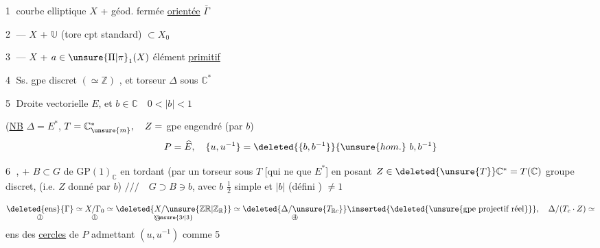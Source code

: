 \textcircled{1} courbe elliptique $X$ + géod. fermée \uline{orientée} $\bar\Gamma$ 

\textcircled{2} --- $X$ +    $\mathbb U$ (tore cpt standard) $\subset X_0$

\textcircled{3} --- $X$ + $a\in\unsure{\Pi|\pi}_1(X)$ élément \uline{primitif}

\textcircled{4} Ss. gpe discret $(\simeq\mathbb Z)$ , et torseur $\Delta$ sous $\mathbb C^*$ 

\textcircled{5} Droite vectorielle  $E$,   et $b\in\mathbb C\quad 0<|b|<1$

(\uline{NB} $\Delta=E^*$,  $T=\mathbb C^*_{\unsure{m}},\quad Z=$ gpe engendré (par $b$)
\[
P=\widehat E,\quad \{u,u^{-1}\}=\deleted{\{b,b^{-1}\}}\{\unsure{hom.}\ b,b^{-1}\}
\]

\textcircled{6} , +   $B\subset G$  
de $\mathrm{GP}(1)_{\mathbb C}$ en tordant (par un torseur sous $T$
[qui ne  que $E^*$] en posant $Z\in\deleted{\unsure{T}}\mathbb C^*=T(\mathbb C)$ groupe discret,
(i.e. $Z$ donné par $b$) $///\quad G\supset B\ni b$, avec $b$ $\frac12$ simple
et $|b|$ (défini ) $\ne1$

\[
\underset{\text{\textcircled{1}}}{\deleted{\mathrm{ens}}\{\Gamma\}}
\simeq\underset{\text{\textcircled{1}}}{X/\Gamma_0}
\simeq\underset{\text{\textcircled{$\unsure{3\prime|3}$}}}{\deleted{X/\unsure{\mathbb Z\mathbb R|\mathbb Z_{\mathbb R}}}}
\simeq\underset{\text{\textcircled{4}}}{\deleted{\Delta/\unsure{T_{\mathbb R c}}}}
\inserted{\deleted{\unsure{\text{gpe projectif réel}}}},\quad
\Delta/(T_c\cdot Z)\simeq
\]
ens des \uline{cercles} de $P$  admettant  $(u,u^{-1})$ comme  \textcircled{5}
